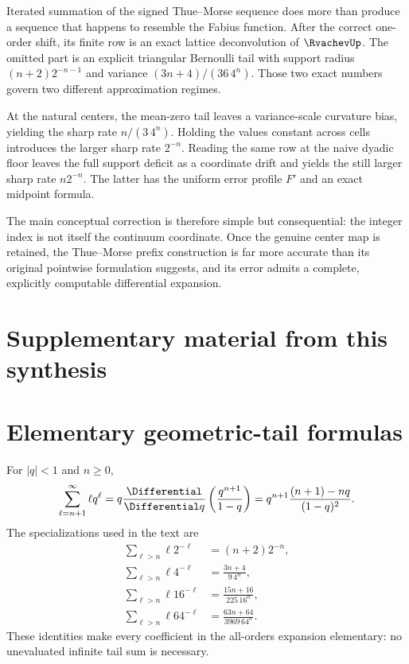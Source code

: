 \documentclass[11pt,oneside]{article}
\theoremstyle{definition}
\theoremstyle{remark}
\begin{document}
Iterated summation of the signed Thue--Morse sequence does more than produce a sequence that
happens to resemble the Fabius function.  After the correct one-order shift, its finite row is
an exact lattice deconvolution of $\RvachevUp$.  The omitted part is an explicit triangular Bernoulli
tail with support radius $(n+2)2^{-n-1}$ and variance $(3n+4)/(36\,4^n)$.  Those two exact
numbers govern two different approximation regimes.

At the natural centers, the mean-zero tail leaves a variance-scale curvature bias, yielding
the sharp rate $n/(3\,4^n)$.  Holding the values constant across cells introduces the larger
sharp rate $2^{-n}$.  Reading the same row at the naive dyadic floor leaves the full support
deficit as a coordinate drift and yields the still larger sharp rate $n2^{-n}$.  The latter
has the uniform error profile $F'$ and an exact midpoint formula.

The main conceptual correction is therefore simple but consequential: the integer index is
not itself the continuum coordinate.  Once the genuine center map is retained, the
Thue--Morse prefix construction is far more accurate than its original pointwise formulation
suggests, and its error admits a complete, explicitly computable differential expansion.

\clearpage
\section*{Supplementary material from this synthesis}
\section{Elementary geometric-tail formulas}
\label{tmrates:app:tails}

For $|q|<1$ and $n\ge0$,
\begin{equation}
 \sum_{\ell=n+1}^{\infty}\ell q^\ell
 =q\frac{\Differential}{\Differential q}\left(\frac{q^{n+1}}{1-q}\right)
 =q^{n+1}\frac{(n+1)-nq}{(1-q)^2}.                        \label{tmrates:eq:geometric-tail}
\end{equation}
The specializations used in the text are
\begin{align}
 \sum_{\ell>n}\ell2^{-\ell}&=(n+2)2^{-n},\\
 \sum_{\ell>n}\ell4^{-\ell}&=\frac{3n+4}{9\,4^n},\\
 \sum_{\ell>n}\ell16^{-\ell}&=\frac{15n+16}{225\,16^n},\\
 \sum_{\ell>n}\ell64^{-\ell}&=\frac{63n+64}{3969\,64^n}.
\end{align}
These identities make every coefficient in the all-orders expansion elementary: no
unevaluated infinite tail sum is necessary.
\end{document}
